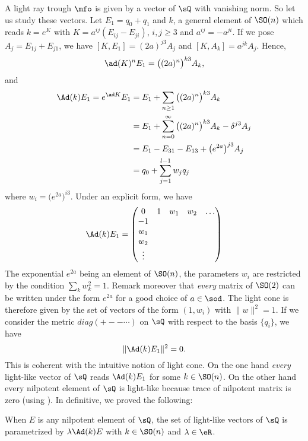 A light ray trough $\mfo$ is given by a vector of $\sQ$ with vanishing norm. So let us study these vectors. Let $E_1=q_0+q_1$ and $k$, a general element of  $\SO(n)$ which reads $k= e^{K}$ with $K=a^{ij}(E_{ij}-E_{ji})$, $i,j\geq 3$ and $a^{ij}=-a^{ji}$.  If we pose $A_j=E_{1j}+E_{j1}$, we have $[K,E_1]=(2a)^{j3}A_j$ and $[K,A_k]=a^{jk}A_j$. Hence,
\[
\ad(K)^nE_1=\big((2a)^n\big)^{k3}A_k,
\]
and
\begin{equation} \label{eq:Adkeu} 
\begin{split}
\Ad(k)E_1=e^{\ad K}E_1&=E_1+\sum_{n\geq 1}\big( (2a)^n\big)^{k3}A_k\\
	      &=E_1+\sum_{n=0}^{\infty}\big(  (2a)^n \big)^{k3}A_k-\delta^{j3}A_j\\
		&=E_1-E_{31}-E_{13}+\big( e^{2a}\big)^{j3}A_j\\
	      &=q_0+\sum_{j=1}^{l-1}w_jq_j
\end{split}
\end{equation}
where $w_i=\big(  e^{2a} \big)^{i3}$. Under an explicit form, we have 
 \begin{equation} \label{eq:AdkE} 
   \Ad(k)E_1=
\begin{pmatrix}
0&1&w_1&w_2&\ldots\\
-1\\
w_1\\
w_2\\
\vdots
\end{pmatrix}
\end{equation}
The exponential $ e^{2a}$ being an element of $\SO(n)$, the parameters $w_i$ are restricted by the condition $\sum_{k}w_k^2=1$.  Remark moreover that \emph{every} matrix of $\SO(2)$ can be written under the form $e^{2a}$ for a good choice of $a\in\sod$. The light cone is therefore given by the set of vectors of the form $(1,w_i)$ with $\|w\|^2=1$. If we consider the metric $diag(+--\cdots)$ on $\sQ$ with respect to the basis $\{q_i\}$, we have
\[
  \|\Ad(k)E_1\|^2=0.
\]
This is coherent with the intuitive notion of light cone. On the one hand \emph{every} light-like vector of $\sQ$ reads $\Ad(k)E_1$ for some $k\in\SO(n)$. On the other hand every nilpotent element of $\sQ$ is light-like because trace of nilpotent matrix is zero (using ). In definitive, we proved the following:

\begin{proposition}		\label{PropNormZeroEQnil}
When $E$ is any nilpotent element of $\sQ$, the set of light-like vectors of $\sQ$ is parametrized by $\lambda\Ad(k)E$ with $k\in\SO(n)$ and $\lambda\in\eR$.
\label{PropToutVectLumQ}
\end{proposition}

